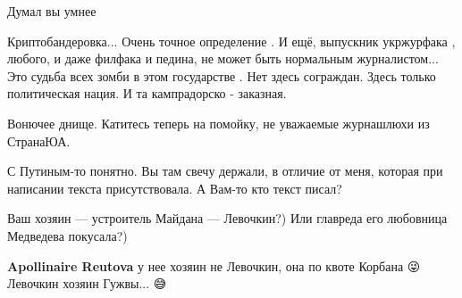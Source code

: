 \begin{itemize}
 
Думал вы умнее

 

Криптобандеровка... Очень точное определение . И ещё, выпускник укржурфака ,
любого, и даже филфака и педина, не может быть нормальным журналистом... Это
судьба всех зомби в этом государстве . Нет здесь сограждан. Здесь только
политическая нация. И та кампрадорско - заказная.

 

Вонючее днище. Катитесь теперь на помойку, не уважаемые журнашлюхи из СтранаЮА.


 

С Путиным-то понятно. Вы там свечу держали, в отличие от меня, которая при
написании текста присутствовала. А Вам-то кто текст писал? 

Ваш хозяин —
устроитель Майдана — Левочкин?) Или главреда его любовница Медведева покусала?)

\begin{itemize}
 
\textbf{Apollinaire Reutova} у нее хозяин не Левочкин, она по квоте Корбана 😜 Левочкин хозяин Гужвы... 😅

 

\end{itemize}
\end{itemize}
